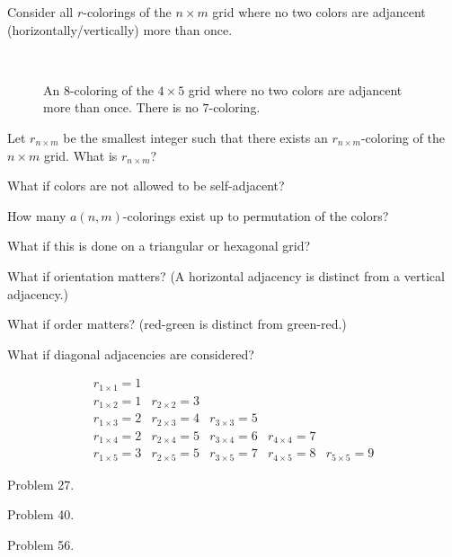 \documentclass{article}
\begin{document}
  Consider all $r$-colorings of the $n \times m$ grid where no two colors
  are adjancent (horizontally/vertically) more than once.

\begin{figure}[!h]
  \centering
  \\
  \caption{An $8$-coloring of the $4 \times 5$ grid where no two colors are adjancent
    more than once. There is no $7$-coloring.}
\end{figure}

\begin{question}
  Let $r_{n\times m}$ be the smallest integer such that there exists an
  $r_{n \times m}$-coloring of the $n \times m$ grid. What is $r_{n\times m}$?
\end{question}
\begin{related}
  \item What if colors are not allowed to be self-adjacent?
  \item How many $a(n, m)$-colorings exist up to permutation of the colors?
  \item What if this is done on a triangular or hexagonal grid?
  \item What if orientation matters?
    (A horizontal adjacency is distinct from a vertical adjacency.)
  \item What if order matters? (red-green is distinct from green-red.)
  \item What if diagonal adjacencies are considered?
\end{related}

\begin{note}
  \[
    \begin{array}{ccccc}
      r_{1 \times 1} = 1 \\
      r_{1 \times 2} = 1 & r_{2 \times 2} = 3 \\
      r_{1 \times 3} = 2 & r_{2 \times 3} = 4 & r_{3 \times 3} = 5 \\
      r_{1 \times 4} = 2 & r_{2 \times 4} = 5 & r_{3 \times 4} = 6 & r_{4 \times 4} = 7 \\
      r_{1 \times 5} = 3 & r_{2 \times 5} = 5 & r_{3 \times 5} = 7 & r_{4 \times 5} = 8 & r_{5 \times 5} = 9
    \end{array}
  \]
\end{note}

\begin{references}
  \item Problem 27.
  \item Problem 40.
  \item Problem 56.
\end{references}
\end{document}
